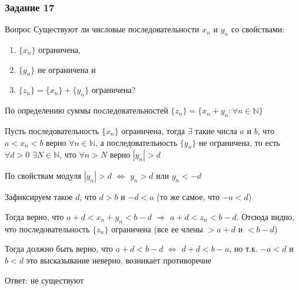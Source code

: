 \documentclass[8pt]{beamer}
\begin{document}
  \begin{frame}
    \frametitle{Задание 17}

    \begin{block}{Вопрос}
      Существуют ли числовые последовательности $x_n$ и $y_n$ со свойствами:
      \begin{enumerate}
        \item $\{x_n\}$ ограничена,
        \item $\{y_n\}$ не ограничена и
        \item $\{z_n\} = \{x_n\} + \{y_n\}$ ограничена?
      \end{enumerate}
    \end{block} \pause

    По определению суммы последовательностей $\{z_n\} = \{x_n + y_n: \forall n \in \mathbb{N}\}$ \pause

    Пусть последовательность $\{x_n\}$ ограничена, тогда $\exists$ такие числа $a$ и $b$, что
    $a < x_n < b$ верно $\forall n \in \mathbb{N}$,
    а последовательность $\{y_n\}$ не ограничена, то есть $\forall d > 0$ $\exists N \in \mathbb{N}$,
    что $\forall n > N$ верно $|y_n| > d$ \pause

    По свойствам модуля $|y_n| > d$ $\Leftrightarrow$ $y_n > d$ или $y_n < -d$ \pause

    Зафиксируем такое $d$, что $d > b$ и $-d < a$ (то же самое, что $-a < d$) \pause

    Тогда верно, что $a + d < x_n + y_n < b - d$ $\Rightarrow$ $a + d < z_n < b - d$. Отсюда
    видно, что последовательность $\{z_n\}$ ограничена (все ее члены $> a + d$ и $< b - d$) \pause
    
    Тогда должно быть верно, что $a + d < b - d$ $\Leftrightarrow$ $d + d < b - a$,
    но т.к. $-a < d$ и $b < d$ это высказывание неверно, возникает противоречие \pause

    \begin{flushright}
      Ответ: не существуют
    \end{flushright}
  \end{frame}
\end{document}
